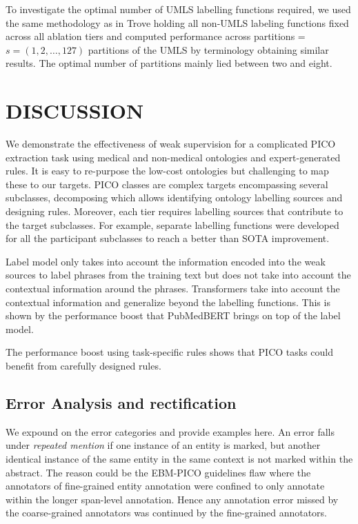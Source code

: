 \documentclass[10.7pt,]{article}
\begin{document}
To investigate the optimal number of UMLS labelling functions required, we used the same methodology as in Trove holding all non-UMLS labeling functions fixed across all ablation tiers and computed performance across partitions = $s = ( 1, 2, \dotso , 127 )$ partitions of the UMLS by terminology obtaining similar results.
The optimal number of partitions mainly lied between two and eight.
%
%
%
\section{DISCUSSION}\label{discussion}
%
We demonstrate the effectiveness of weak supervision for a complicated PICO extraction task using medical and non-medical ontologies and expert-generated rules.
It is easy to re-purpose the low-cost ontologies but challenging to map these to our targets.
PICO classes are complex targets encompassing several subclasses, decomposing which allows identifying ontology labelling sources and designing rules. 
Moreover, each tier requires labelling sources that contribute to the target subclasses.
For example, separate labelling functions were developed for all the participant subclasses to reach a better than SOTA improvement.


Label model only takes into account the information encoded into the weak sources to label phrases from the training text but does not take into account the contextual information around the phrases.
Transformers take into account the contextual information and generalize beyond the labelling functions.
This is shown by the performance boost that PubMedBERT brings on top of the label model.

The performance boost using task-specific rules shows that PICO tasks could benefit from carefully designed rules.
%
%
%
\subsection{Error Analysis and rectification}\label{err_ana}
%
We expound on the error categories and provide examples here.
An error falls under \textit{repeated mention} if one instance of an entity is marked, but another identical instance of the same entity in the same context is not marked within the abstract. 
The reason could be the EBM-PICO guidelines flaw where the annotators of fine-grained entity annotation were confined to only annotate within the longer span-level annotation.
Hence any annotation error missed by the coarse-grained annotators was continued by the fine-grained annotators.
\end{document}
